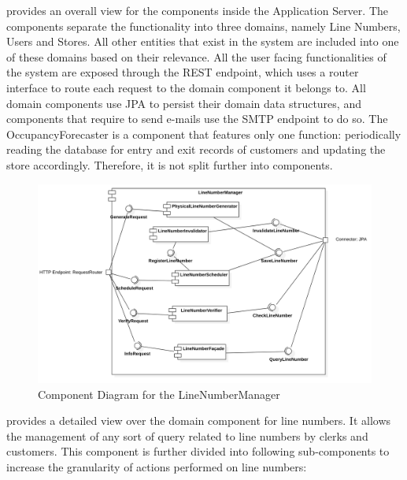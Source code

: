  provides an overall view for the components inside the Application Server.
The components separate the functionality into three domains, namely Line Numbers, Users and Stores.
All other entities that exist in the system are included into one of these domains based on their relevance.
All the user facing functionalities of the system are exposed through the REST endpoint, which uses a router interface to route each request to the domain component it belongs to.
All domain components use JPA to persist their domain data structures, and components that require to send e-mails use the SMTP endpoint to do so.
The OccupancyForecaster is a component that features only one function: periodically reading the database for entry and exit records of customers and updating the store accordingly.
Therefore, it is not split further into components.
\begin{figure}[H]
    \centering
    \includegraphics[height=0.4\textwidth]{Images/ComponentDiagrams/LineNumberManager.png}
    \caption{Component Diagram for the LineNumberManager}
    \label{fig:CDLineNumberManager}
\end{figure}
 provides a detailed view over the domain component for line numbers.
It allows the management of any sort of query related to line numbers by clerks and customers.
This component is further divided into following sub-components to increase the granularity of actions performed on line numbers:
